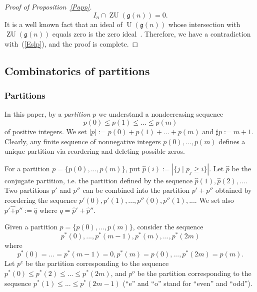 \documentclass{emsprocart}
\begin{document}
\begin{proof}[Proof of Proposition~\ref{Papp}]
$$I_n\cap\operatorname{ZU}(\mathfrak g(n))=0.$$%
It is a well known fact that an ideal of $\operatorname{U}(\mathfrak g(n))$ whose intersection with $\operatorname{ZU}(\mathfrak g(n))$ equals zero is the zero ideal~\cite[Proposition 4.2.2]{Dix}. Therefore, we have a contradiction with~(\ref{Eslp}), and the proof is complete.
\end{proof}


\subsection{Combinatorics of partitions}\label{SScp}
\subsubsection{Partitions} In this paper, by a {\it partition} $p$ we understand a nondecreasing sequence $$p(0)\le p(1)\le...\le p(m)$$ of positive integers. We set $|p|:=p(0)+p(1)+...+p(m)$ and $\sharp p:=m+1$.
Clearly, any finite sequence of nonnegative integers $p(0),..., p(m)$ defines a unique partition via reordering and deleting possible zeros. %

For a partition $p=\{p(0),..., p(m)\}$, put $\widehat p(i):=|\{j\mid p_j\ge i\}|$. Let $\widehat p$ be the conjugate partition, i.e. the partition defined by the sequence $\widehat p(1), \widehat p(2),...$. Two partitions $p'$ and $p''$ can be combined into the partition $p'+p''$ obtained by reordering the sequence $p'(0), p'(1),..., p''(0), p''(1),...$. We set also $p'\widehat+p'':=\widehat q$ where $q=\widehat p'+\widehat p''$.

Given a partition $p=\{p(0),..., p(m)\}$, consider the sequence $$p^*(0),..., p^*(m-1), p^*(m),..., p^*(2m)$$ where $$p^*(0)=...=p^*(m-1)=0, p^*(m)=p(0),..., p^*(2m)=p(m).$$
Let $p^e$ be the partition corresponding to the sequence $p^*(0)\le p^*(2)\le...\le p^*(2m)$, and $p^o$ be the partition corresponding to the sequence $p^*(1)\le...\le p^*(2m-1)$ (``e'' and ``o'' stand for ``even'' and ``odd'').
\end{document}
